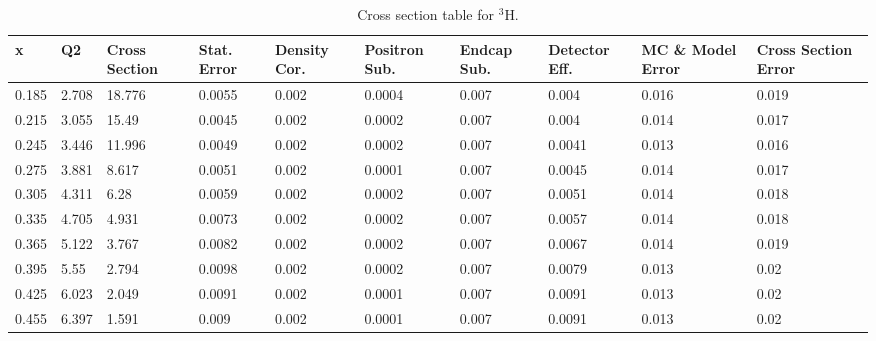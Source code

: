 \begin{sidewaystable}
\caption{Cross section table for $^3$H. }\label{CST_H3}
	\begin{tabular}{|p{1cm}|p{1cm}|p{1.5cm}|p{1.5cm}|p{2cm}|p{2cm}|p{1.5cm}|p{1.5cm}|p{2.5cm}|p{2.5cm}|}
		\hline
		x     & Q2     & Cross Section & Stat. Error & Density Cor. & Positron Sub. & Endcap Sub. & Detector Eff. & MC \& Model Error & Cross Section Error \\ \hline
		0.185 & 2.708  & 18.776        & 0.0055            & 0.002              & 0.0004               & 0.007              & 0.004                 & 0.016             & 0.019               \\ \hline
		0.215 & 3.055  & 15.49         & 0.0045            & 0.002              & 0.0002               & 0.007              & 0.004                 & 0.014             & 0.017               \\ \hline
		0.245 & 3.446  & 11.996        & 0.0049            & 0.002              & 0.0002               & 0.007              & 0.0041                & 0.013             & 0.016               \\ \hline
		0.275 & 3.881  & 8.617         & 0.0051            & 0.002              & 0.0001               & 0.007              & 0.0045                & 0.014             & 0.017               \\ \hline
		0.305 & 4.311  & 6.28          & 0.0059            & 0.002              & 0.0002               & 0.007              & 0.0051                & 0.014             & 0.018               \\ \hline
		0.335 & 4.705  & 4.931         & 0.0073            & 0.002              & 0.0002               & 0.007              & 0.0057                & 0.014             & 0.018               \\ \hline
		0.365 & 5.122  & 3.767         & 0.0082            & 0.002              & 0.0002               & 0.007              & 0.0067                & 0.014             & 0.019               \\ \hline
		0.395 & 5.55   & 2.794         & 0.0098            & 0.002              & 0.0002               & 0.007              & 0.0079                & 0.013             & 0.02                \\ \hline
		0.425 & 6.023  & 2.049         & 0.0091            & 0.002              & 0.0001               & 0.007              & 0.0091                & 0.013             & 0.02                \\ \hline
		0.455 & 6.397  & 1.591         & 0.009             & 0.002              & 0.0001               & 0.007              & 0.0091                & 0.013             & 0.02                \\ \hline

\end{tabular}
\end{sidewaystable}
